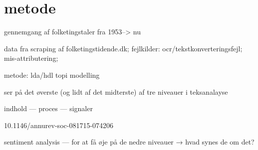 \section{metode}

gennemgang af folketingstaler fra 1953--> nu

data fra scraping af folketingstidende.dk; fejlkilder: ocr/tekstkonverteringsfejl; mis-attributering;

metode: lda/hdl topi modelling

ser på det øverste (og lidt af det midterste) af tre niveauer i teksanalayse

indhold — proces — signaler 

10.1146/annurev-soc-081715-074206

sentiment analysis — for at få øje på de nedre niveauer
→ hvad synes de om det?
